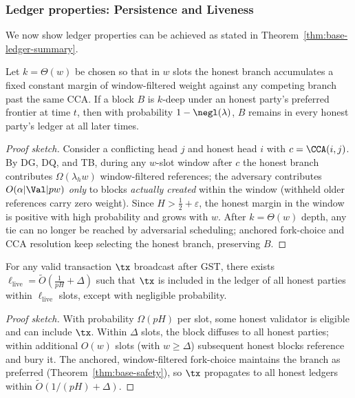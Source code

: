 \subsubsection{Ledger properties: Persistence and Liveness}


We now show ledger properties can be achieved as stated in Theorem~\ref{thm:base-ledger-summary}. 


\begin{theorem}
\label{thm:base-safety}
Let $k=\Theta(w)$ be chosen so that in $w$ slots the honest branch accumulates a fixed constant margin of window-filtered weight against any competing branch past the same CCA. If a block $B$ is $k$-deep under an honest party's preferred frontier at time $t$, then with probability $1-\negl(\lambda)$, $B$ remains in every honest party's ledger at all later times.
\end{theorem}
\begin{proof}[Proof sketch]
Consider a conflicting head $j$ and honest head $i$ with $c=\CCA(i,j)$. By DG, DQ, and TB, during any $w$-slot window after $c$ the honest branch contributes $\Omega(\lambda_h w)$ window-filtered references; the adversary contributes $O(\alpha |\Val| p w)$ \emph{only} to blocks \emph{actually created} within the window (withheld older references carry zero weight). Since $H>\tfrac{1}{2}{+}\varepsilon$, the honest margin in the window is positive with high probability and grows with $w$. After $k=\Theta(w)$ depth, any tie can no longer be reached by adversarial scheduling; anchored fork-choice and CCA resolution keep selecting the honest branch, preserving $B$.
\end{proof}

\begin{theorem}
\label{thm:base-liveness}
For any valid transaction $\tx$ broadcast after GST, there exists $\ell_{\mathrm{live}}=\tilde{O}\!\left( \frac{1}{pH} + \Delta \right)$ such that $\tx$ is included in the ledger of all honest parties within $\ell_{\mathrm{live}}$ slots, except with negligible probability.
\end{theorem}
\begin{proof}[Proof sketch]
With probability $\Omega(pH)$ per slot, some honest validator is eligible and can include $\tx$. Within $\Delta$ slots, the block diffuses to all honest parties; within additional $O(w)$ slots (with $w\ge \Delta$) subsequent honest blocks reference and bury it. The anchored, window-filtered fork-choice maintains the branch as preferred (Theorem~\ref{thm:base-safety}), so $\tx$ propagates to all honest ledgers within $\tilde{O}(1/(pH)+\Delta)$.
\end{proof}

